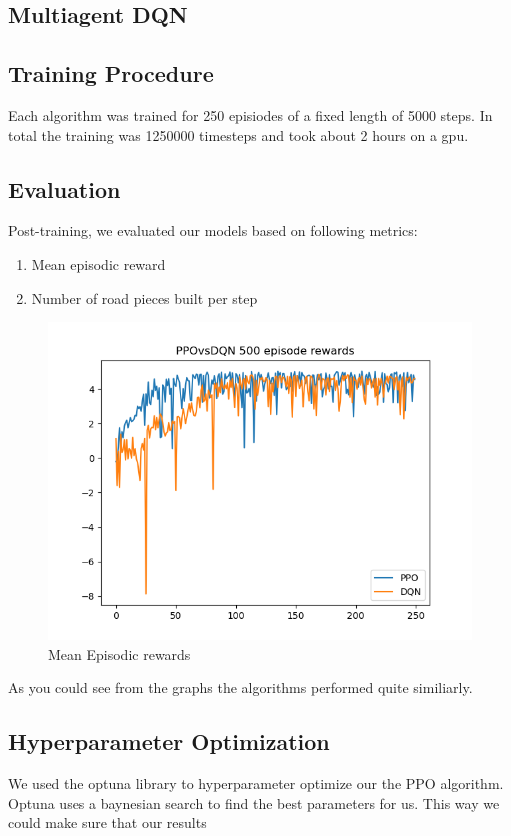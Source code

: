 \documentclass[conference]{IEEEtran}
\begin{document}
	\subsection{Multiagent DQN}

	\subsection{Training Procedure}
	Each algorithm was trained for 250 episiodes of a fixed length of 5000 steps. In total the training was 1250000 timesteps and took about 2 hours on a gpu.

	\subsection{Evaluation}
	Post-training, we evaluated our models based on following metrics:
	\begin{enumerate}
		\item Mean episodic reward
		\item Number of road pieces built per step
	\end{enumerate}

	\begin{figure}[h!]
		\includegraphics[width=\columnwidth]{graphs/PPOvsDQN250.png}
		\caption{Mean Episodic rewards}
	\end{figure}

	As you could see from the graphs the algorithms performed quite similiarly.

	\subsection{Hyperparameter Optimization}
	We used the optuna library to hyperparameter optimize our the PPO algorithm. Optuna uses a baynesian search to find the best parameters for us. This way we could make sure that our results
\end{document}

